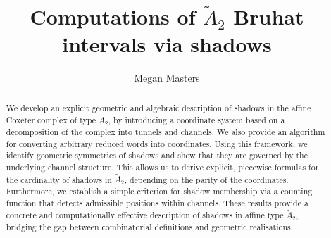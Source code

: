 \documentclass[11pt]{article}
\begin{document}
\newtheorem{theorem}{Theorem}
\newtheorem{proposition}[theorem]{Proposition}
\newtheorem{lemma}[theorem]{Lemma}
\newtheorem{corollary}[theorem]{Corollary}
\theoremstyle{definition}
\newtheorem{definition}[theorem]{Definition}
\newtheorem{example}[theorem]{Example}
\newtheorem{remark}[theorem]{Remark}
\newtheorem{conjecture}[theorem]{Conjecture}
\newtheorem{algorithm}[theorem]{Algorithm}

\newcommand{\uw}{\mathcal{U}(W,X)}
\newcommand{\W}{$(W,S)$}
\newcommand{\ix}{\textbf}
\newcommand{\tr}{\textcolor{red}}
\newcommand{\sg}{$\Sigma$}
\newcommand{\x}{\mathcal{X}}
\newcommand{\C}{\mathcal{C}}
\newcommand{\tw}{T_{w^{-1}}^{-1}}
\newcommand{\mch}{\mathcal{H}}
\newcommand{\aw}{\tilde{A}_2}
\newcommand{\Sh}[1]{\textnormal{Sh}(#1)}
\newcommand{\nSh}[1]{\textnormal{Sh}^\textnormal{c}(#1)}
\newcommand{\PSh}[1]{\textnormal{PSh}(#1)}
\newcommand{\nPSh}[1]{\textnormal{Annex}(#1)}
\newcommand{\wk}{w_k}
\newcommand{\wj}{w_j}
\newcommand{\wi}{w_i}
\newcommand{\B}[1]{B(#1)}
\newcommand{\Hid}{H^{\mathbf{1}}}
\newcommand{\Hinf}{H^\infty}
\newcommand{\cinf}{\mathcal{C}_\infty}

\title{Computations of $\aw$ Bruhat intervals via shadows}

\author{Megan Masters}
\maketitle

\begin{abstract}
    We develop an explicit geometric and algebraic description of shadows in the affine Coxeter complex of type $\aw$, by introducing a coordinate system based on a decomposition of the complex into tunnels and channels. We also provide an algorithm for converting arbitrary reduced words into coordinates. Using this framework, we identify geometric symmetries of shadows and show that they are governed by the underlying channel structure. This allows us to derive explicit, piecewise formulas for the cardinality of shadows in $\aw$, depending on the parity of the coordinates. Furthermore, we establish a simple criterion for shadow membership via a counting function that detects admissible positions within channels. These results provide a concrete and computationally effective description of shadows in affine type $\aw$, bridging the gap between combinatorial definitions and geometric realisations.

\end{abstract}
\end{document}
